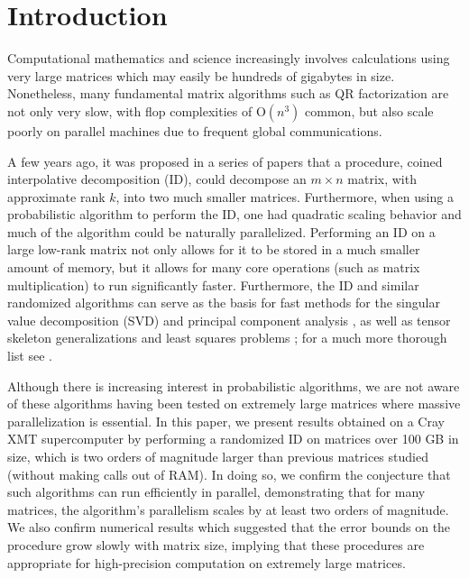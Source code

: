 \documentclass[11pt]{article}
\begin{document}
\tableofcontents




\section{Introduction}
Computational mathematics and science increasingly involves calculations using very large matrices which may easily be hundreds of gigabytes in size.  Nonetheless, many fundamental matrix algorithms such as QR factorization are not only very slow, with flop complexities of $\mathrm{O}(n^3)$ common, but also scale poorly on parallel machines due to frequent global communications.

A few years ago, it was proposed in a series of papers \cite{rokyale1, rokyale2, rokpnas} that a procedure, coined interpolative decomposition (ID), could decompose an $m\times n$ matrix, with approximate rank $k$, into two much smaller matrices.  Furthermore, when using a probabilistic algorithm to perform the ID, one had quadratic scaling behavior and much of the algorithm could be naturally parallelized.   Performing an ID on a large low-rank matrix not only allows for it to be stored in a much smaller amount of memory, but it allows for many core operations (such as matrix multiplication) to run significantly faster.  Furthermore, the ID and similar randomized algorithms can serve as the basis for fast methods for the singular value decomposition (SVD) \cite{rokpnas} and principal component analysis \cite{rok1}, as well as tensor skeleton generalizations \cite{drineas} and least squares problems \cite{boutsidis, rok2, rudelson}; for a much more thorough list see \cite{martinsson}.

Although there is increasing interest in probabilistic algorithms, we are not aware of these algorithms having been tested on extremely large matrices where massive parallelization is essential.  In this paper, we present results obtained on a Cray XMT supercomputer by performing a randomized ID on matrices over 100 GB in size, which is two orders of magnitude larger than previous matrices studied (without making calls out of RAM).   In doing so, we confirm the conjecture that such algorithms can run efficiently in parallel, demonstrating that for many matrices, the algorithm's parallelism scales by at least two orders of magnitude.  We also confirm numerical results which suggested that the error bounds on the procedure grow slowly with matrix size, implying that these procedures are appropriate for high-precision computation on extremely large matrices.
\end{document}
